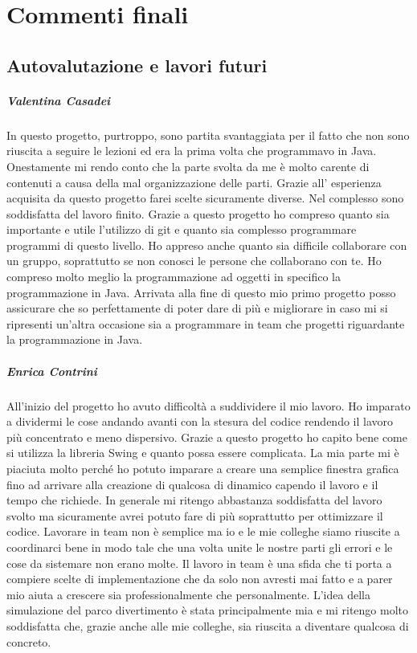 \documentclass[a4paper,12pt]{report}
\begin{document}
\chapter{Commenti finali}

\section{Autovalutazione e lavori futuri}

\paragraph{Valentina Casadei} In questo progetto, purtroppo, sono partita svantaggiata per il fatto che non sono riuscita a seguire le lezioni ed era la prima volta che programmavo in Java.
Onestamente mi rendo conto che la parte svolta da me è molto carente di contenuti a causa della mal organizzazione delle parti. Grazie all’ esperienza acquisita da questo progetto farei scelte sicuramente diverse.
Nel complesso sono soddisfatta del lavoro finito.
Grazie a questo progetto ho compreso quanto sia importante e utile l’utilizzo di git e quanto sia complesso programmare programmi di questo livello. Ho appreso anche quanto sia difficile collaborare con un gruppo, soprattutto se non conosci le persone che collaborano con te. Ho compreso molto meglio la programmazione ad oggetti in specifico la programmazione in Java. 
Arrivata alla fine di questo mio primo progetto posso assicurare che so perfettamente di poter dare di più e migliorare in caso mi si ripresenti un’altra occasione sia a programmare in team che progetti riguardante la programmazione in Java.


\paragraph{Enrica Contrini} All’inizio del progetto ho avuto difficoltà a suddividere il mio lavoro. Ho imparato a dividermi le cose andando avanti con la stesura del codice rendendo il lavoro più concentrato e meno dispersivo. 
Grazie a questo progetto ho capito bene come si utilizza la libreria Swing e quanto possa essere complicata. 
La mia parte mi è piaciuta molto perché ho potuto imparare a creare una semplice finestra grafica fino ad arrivare alla creazione di qualcosa di dinamico capendo il lavoro e il tempo che richiede. 
In generale mi ritengo abbastanza soddisfatta del lavoro svolto ma sicuramente avrei potuto fare di più soprattutto per ottimizzare il codice.
Lavorare in team non è semplice ma io e le mie colleghe siamo riuscite a coordinarci bene in modo tale che una volta unite le nostre parti gli errori e le cose da sistemare non erano molte. Il lavoro in team è una sfida che ti porta a compiere scelte di implementazione che da solo non avresti mai fatto e a parer mio aiuta a crescere sia professionalmente che personalmente. 
L’idea della simulazione del parco divertimento è stata principalmente mia e mi ritengo molto soddisfatta che, grazie anche alle mie colleghe, sia riuscita a diventare qualcosa di concreto.
\end{document}
